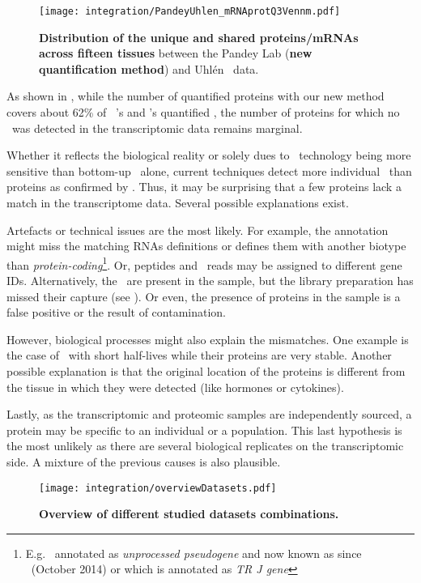\vspace{-4mm}
\begin{figure}[!ht]
    \texttt{[image: integration/PandeyUhlen\_mRNAprotQ3Vennm.pdf]}\centering
    \vspace{-4mm}
    \caption[Distribution of the unique and shared proteins/mRNAs
    ahlcross fifteen tissues between Pandey Lab (new quantification method)
    and Uhlén \textit{et al.} data]{\label{fig:PU_vennQ3}\textbf{Distribution of the
    unique and shared proteins/mRNAs across fifteen tissues} between
    the Pandey Lab (\textbf{new quantification method})
    and Uhlén \etal\ data.}
\end{figure}

As shown in ,
while the number of quantified proteins
with our new method
covers about 62\% of \uhlen\ \etal{}'s and \gtex{}'s quantified \mRNAs,
the number of proteins for which no \mRNA\ was detected
in the transcriptomic data remains marginal.

Whether it reflects the biological reality or
solely dues to \Rnaseq\ technology being more sensitive than
bottom-up \ms\ alone,
current techniques detect more individual \mRNAs\ than proteins
as confirmed by .
Thus, it may be surprising that
a few proteins lack a match in the transcriptome data.
Several possible explanations exist.

Artefacts or technical issues are the most likely.
For example, the annotation might miss
the matching \glspl{RNA} definitions
or defines them with another biotype than \emph{protein-coding}\footnote{%
E.g.\  annotated as \textit{unprocessed pseudogene}
and now known as  since ~(October 2014) or
 which is annotated as \textit{TR J gene}%
}.
Or, peptides and \mRNA\ reads may be assigned to different gene IDs.
Alternatively, the \mRNAs\ are present in the sample,
but the library preparation has missed their capture
(see ).
Or even, the presence of proteins in the sample is a false positive
or the result of contamination.\mybr\

However, biological processes might also explain the mismatches.
One example is the case of \mRNAs\ with short half-lives
while their proteins are very stable.
Another possible explanation is that
the original location of the proteins is different
from the tissue in which they were detected
(like hormones or cytokines).

Lastly, as the transcriptomic and proteomic samples are independently sourced,
a protein may be specific to an individual or a population.
This last hypothesis is the most unlikely
as there are several biological replicates on the transcriptomic side.
A mixture of the previous causes is also plausible.
\vspace{-4mm}
\begin{figure}[!hb]
     \texttt{[image: integration/overviewDatasets.pdf]}\centering
     \vspace{-3mm}
     \caption[Overview of different datasets combination]{%
     \label{fig:setsOverview}\textbf{Overview of different studied datasets
     combinations.}}
\end{figure}

